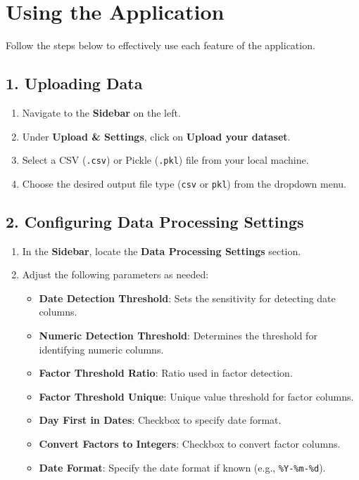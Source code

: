 \documentclass[12pt,a4paper]{article}
\begin{document}
\section{Using the Application}
Follow the steps below to effectively use each feature of the application.

\subsection{1. Uploading Data}
\begin{enumerate}
    \item Navigate to the \textbf{Sidebar} on the left.
    \item Under \textbf{Upload \& Settings}, click on \textbf{Upload your dataset}.
    \item Select a CSV (\texttt{.csv}) or Pickle (\texttt{.pkl}) file from your local machine.
    \item Choose the desired output file type (\texttt{csv} or \texttt{pkl}) from the dropdown menu.
\end{enumerate}

\subsection{2. Configuring Data Processing Settings}
\begin{enumerate}
    \item In the \textbf{Sidebar}, locate the \textbf{Data Processing Settings} section.
    \item Adjust the following parameters as needed:
    \begin{itemize}
        \item \textbf{Date Detection Threshold}: Sets the sensitivity for detecting date columns.
        \item \textbf{Numeric Detection Threshold}: Determines the threshold for identifying numeric columns.
        \item \textbf{Factor Threshold Ratio}: Ratio used in factor detection.
        \item \textbf{Factor Threshold Unique}: Unique value threshold for factor columns.
        \item \textbf{Day First in Dates}: Checkbox to specify date format.
        \item \textbf{Convert Factors to Integers}: Checkbox to convert factor columns.
        \item \textbf{Date Format}: Specify the date format if known (e.g., \texttt{\%Y-\%m-\%d}).
    \end{itemize}
\end{enumerate}
\end{document}
